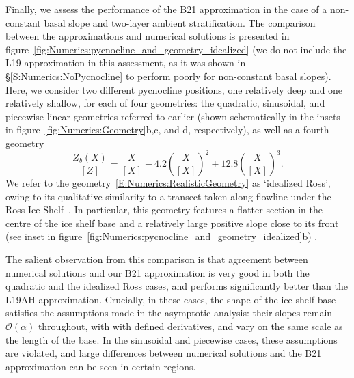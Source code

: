 \documentclass[openacc]{rsproca_new}%
\newcommand{\order}[1]{\mathcal{O}(#1)}
\begin{document}
Finally, we assess the performance of the B21 approximation in the case of a non-constant basal slope and two-layer ambient stratification. The comparison between the approximations and numerical solutions is presented in figure~\ref{fig:Numerics:pycnocline_and_geometry_idealized} (we do not include the L19 approximation in this assessment, as it was shown in \S\ref{S:Numerics:NoPycnocline} to perform poorly for non-constant basal slopes). Here, we consider two different pycnocline positions, one relatively deep and one relatively shallow, for each of four geometries: the quadratic, sinusoidal, and piecewise linear geometries referred to earlier (shown schematically in the insets in figure~\ref{fig:Numerics:Geometry}b,c, and d, respectively), as well as a fourth geometry 
\begin{equation}\label{E:Numerics:RealisticGeometry}
\frac{Z_b(X)}{\left[Z\right]}= \frac{X}{\left[X\right]} -4.2\left(\frac{X}{\left[X\right]}\right)^2 + 12.8\left(\frac{X}{\left[X\right]}\right)^3.
\end{equation}
We refer to the geometry~\eqref{E:Numerics:RealisticGeometry} as `idealized Ross', owing to its qualitative similarity to a transect taken along flowline under the Ross Ice Shelf~\citep{Shabtaie1987JGeophysResSolidEarth}. In particular, this geometry features a flatter section in the centre of the ice shelf base and a relatively large positive slope close to its front (see inset in figure~\ref{fig:Numerics:pycnocline_and_geometry_idealized}b) .

The salient observation from this comparison is that agreement between numerical solutions and our B21 approximation is very good in both the quadratic and the idealized Ross cases, and performs significantly better than the L19AH approximation. Crucially, in these cases, the shape of the ice shelf base satisfies the assumptions made in the asymptotic analysis: their slopes remain $\order{\alpha}$ throughout, with with defined derivatives, and vary on the same scale as the length of the base. In the sinusoidal and piecewise cases, these assumptions are violated, and large differences between numerical solutions and the B21 approximation can be seen in certain regions.
\end{document}
